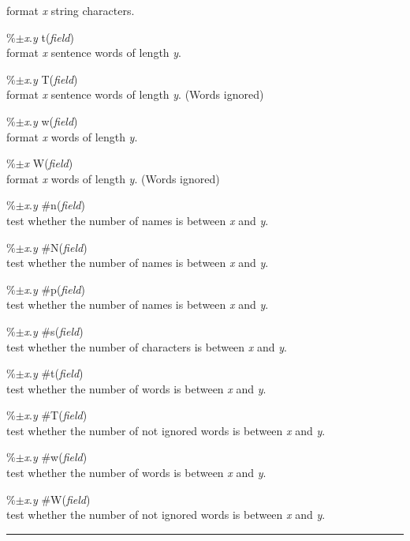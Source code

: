 \documentclass[a4paper]{article}
\newenvironment{FlatList}{\begin{list}{}{%
      \topsep=0pt\itemsep=0pt\parsep=0pt\let\makelabel=\flatlistlabel}}{\end{list}}%
\newcommand\flatlistlabel[1]{\descriptionlabel{\sf #1}}
\begin{document}
\begin{multicols}{2}
\begin{FlatList}
    format {\it x}\/ string characters.
  \item [\%$\pm ${\it x}.{\it y}\/ t({\it field}\/)]\ \\
    format {\it x}\/ sentence words of length {\it y}.
  \item [\%$\pm ${\it x}.{\it y}\/ T({\it field}\/)]\ \\
    format {\it x}\/ sentence words  of length {\it y}. (Words ignored)
  \item [\%$\pm ${\it x}.{\it y}\/ w({\it field}\/)]\ \\
    format {\it x}\/ words of length {\it y}.
  \item [\%$\pm ${\it x}\/ W({\it field}\/)]\ \\
    format {\it x}\/ words of length {\it y}. (Words ignored)
  \item [\%$\pm ${\it x}.{\it y}\/ \#n({\it field}\/)]\ \\
    test whether the  number of names is between {\it x}\/ and {\it y}.
  \item [\%$\pm ${\it x}.{\it y}\/ \#N({\it field}\/)]\ \\
    test whether the  number of names is between {\it x}\/ and {\it y}.
  \item [\%$\pm ${\it x}.{\it y}\/ \#p({\it field}\/)]\ \\
    test whether the  number of names is between {\it x}\/ and {\it y}.
  \item [\%$\pm ${\it x}.{\it y}\/ \#s({\it field}\/)]\ \\
    test whether the  number of characters is between {\it x}\/ and {\it y}.
  \item [\%$\pm ${\it x}.{\it y}\/ \#t({\it field}\/)]\ \\
    test whether the  number of words is between {\it x}\/ and {\it y}.
  \item [\%$\pm ${\it x}.{\it y}\/ \#T({\it field}\/)]\ \\
    test whether the  number of not ignored words is between {\it x}\/
    and {\it y}. 
  \item [\%$\pm ${\it x}.{\it y}\/ \#w({\it field}\/)]\ \\
    test whether the  number of words is between {\it x}\/ and {\it y}.
  \item [\%$\pm ${\it x}.{\it y}\/ \#W({\it field}\/)]\ \\
    test whether the  number of not ignored words is between {\it x}\/
    and {\it y}. 
  \end{FlatList} 
\end{multicols}
\vfill\vfill\vfill
\begin{center}\rule{.8\textwidth}{.1pt}\end{center}
\end{document}
